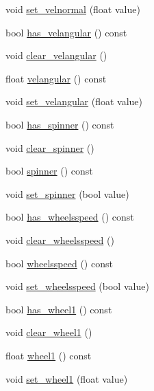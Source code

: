 \begin{DoxyCompactItemize}
\item 
void \hyperlink{classgr_sim___robot___command_a94f1aad0b1950efd4dd09bd0bce41bb8}{set\-\_\-velnormal} (float value)
\item 
bool \hyperlink{classgr_sim___robot___command_aa679c4f0da36d885ecb9001eea3cdfc2}{has\-\_\-velangular} () const 
\item 
void \hyperlink{classgr_sim___robot___command_a2a4a4842f9d2b6cc9ebc474e9947fc5f}{clear\-\_\-velangular} ()
\item 
float \hyperlink{classgr_sim___robot___command_ac3d0c7cd04ca8e912b4fceab020ba627}{velangular} () const 
\item 
void \hyperlink{classgr_sim___robot___command_ad99fcfb635c757ac83434831413d5fed}{set\-\_\-velangular} (float value)
\item 
bool \hyperlink{classgr_sim___robot___command_aa04e58bca042307043334d82ec1a2c60}{has\-\_\-spinner} () const 
\item 
void \hyperlink{classgr_sim___robot___command_a06b24863ddcfd52858ba5cdd80e5dab3}{clear\-\_\-spinner} ()
\item 
bool \hyperlink{classgr_sim___robot___command_ae90aee9cb208d09f5aab295395ba7351}{spinner} () const 
\item 
void \hyperlink{classgr_sim___robot___command_a7d8802b3e2a337af981ae4556c05d8f1}{set\-\_\-spinner} (bool value)
\item 
bool \hyperlink{classgr_sim___robot___command_ac8dc6f4b151c476204327a06691e56c6}{has\-\_\-wheelsspeed} () const 
\item 
void \hyperlink{classgr_sim___robot___command_afa015ddd06d48e845b5dc86bac9e42d5}{clear\-\_\-wheelsspeed} ()
\item 
bool \hyperlink{classgr_sim___robot___command_aca925c8cbdebfde18cc23a77cf9adfa3}{wheelsspeed} () const 
\item 
void \hyperlink{classgr_sim___robot___command_a02a617e7c5c541a74510ba4913a5dbb6}{set\-\_\-wheelsspeed} (bool value)
\item 
bool \hyperlink{classgr_sim___robot___command_a11b8a04e3ff7799562311df7963d0118}{has\-\_\-wheel1} () const 
\item 
void \hyperlink{classgr_sim___robot___command_a6cea9abd19654504da2df17711226fb5}{clear\-\_\-wheel1} ()
\item 
float \hyperlink{classgr_sim___robot___command_a4d9d14d3e856fddb3ddede56c21d239e}{wheel1} () const 
\item 
void \hyperlink{classgr_sim___robot___command_a7725e92312000527d3f9d51fe10762ff}{set\-\_\-wheel1} (float value)

\end{DoxyCompactItemize}
